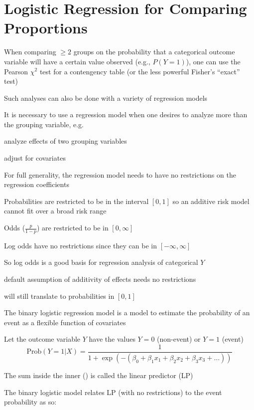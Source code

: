 \section{Logistic Regression for Comparing Proportions}
\bi
\item When comparing $\geq 2$ groups on the probability that a categorical outcome variable will have a certain value observed (e.g., $P(Y=1)$), one can use the Pearson $\chi^2$ test for a contengency table (or the less powerful Fisher's ``exact'' test)
\item Such analyses can also be done with a variety of regression models
\item It is necessary to use a regression model when one desires to analyze more than the grouping variable, e.g.
  \bi
  \item analyze effects of two grouping variables
  \item adjust for covariates
  \ei
\item For full generality, the regression model needs to have no restrictions on the regression coefficients
  \bi
  \item Probabilities are restricted to be in the interval $[0,1]$ so an additive risk model cannot fit over a broad risk range
  \item Odds ($\frac{p}{1-p}$) are restricted to be in $[0, \infty]$
  \item Log odds have no restrictions since they can be in $[-\infty, \infty]$
  \ei
\item So log odds is a good basis for regression analysis of categorical $Y$
 \bi
 \item default assumption of additivity of effects needs no restrictions
 \item will still translate to probabilities in $[0,1]$
 \ei
\item The binary logistic regression model is a model to estimate the probability of an event as a flexible function of covariates
\item Let the outcome variable $Y$ have the values $Y=0$ (non-event) or $Y=1$ (event)
\begin{equation}
  \textrm{Prob}(Y = 1 | X) = \frac{1}{1 + \exp(-(\beta_0 + \beta_1 x_1 + \beta_2 x_2 + \beta_3 x_3 + \ldots))}
\end{equation}
\item The sum inside the inner () is called the linear predictor (LP)
\item The binary logistic model relates LP (with no restrictions) to the event probability as so:
